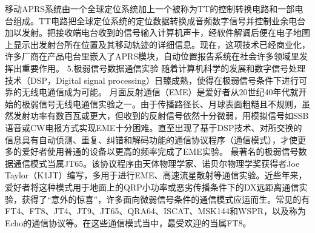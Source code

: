 \documentclass[12pt,UTF8]{ctexbook}
\begin{document}
移动APRS系统由一个全球定位系统加上一个被称为TT的控制转换电路和一部电台组成。TT电路把全球定位系统的定位数据转换成音频数字信号并控制业余电台加以发射。把接收端电台收到的信号输入计算机声卡，经软件解调后便在电子地图上显示出发射台所在位置及其移动轨迹的详细信息。现在，这项技术已经商业化，许多厂商在产品电台里嵌入了APRS模块，自动位置报告系统在社会许多领域里发挥出重要作用。
5.极弱信号数据通信实验
随着计算机科学的发展和数字信号处理技术（DSP，Digital signal processing）日臻成熟，使得在极弱信号条件下进行可靠的无线电通信成为可能。
月面反射通信（EME）是爱好者从20世纪40年代就开始的极弱信号无线电通信实验之一。由于传播路径长、月球表面粗糙且不规则，虽然发射功率有数百瓦或更大，但收到的反射信号依然十分微弱，用模拟信号如SSB语音或CW电报方式实现EME十分困难。直至出现了基于DSP技术、对所交换的信息具有自动侦测、重复、纠错和解码功能的通信协议程序（通信模式），才使更多的爱好者使用普通的设备以更高的频率完成了EME实验。
最著名的极弱信号数据通信模式当属JT65。该协议程序由天体物理学家、诺贝尔物理学奖获得者Joe Taylor（K1JT）编写，多用于进行EME、高速流星散射等通信实验。近些年来，爱好者将这种模式用于地面上的QRP小功率或恶劣传播条件下的DX远距离通信实验，获得了“意外的惊喜”，许多面向微弱信号条件的通信模式应运而生。常见的有FT4、FT8、JT4、JT9、JT65、QRA64、ISCAT、MSK144和WSPR，以及称为Echo的通信协议等。在这些通信模式当中，最受欢迎的当属FT8。
\end{document}
